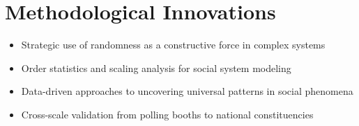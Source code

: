 \section*{Methodological Innovations}

\begin{itemize}
\item Strategic use of randomness as a constructive force in complex systems
\item Order statistics and scaling analysis for social system modeling
\item Data-driven approaches to uncovering universal patterns in social phenomena
\item Cross-scale validation from polling booths to national constituencies
\end{itemize} 